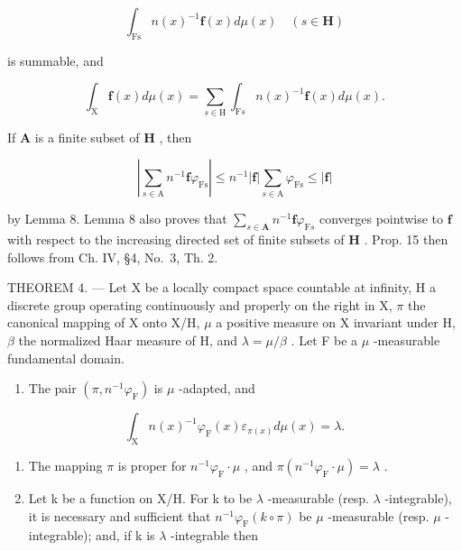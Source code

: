 \[
\int_ {\mathrm{Fs}} n (x) ^ {- 1} \mathbf {f} (x) d \mu (x) \quad (s \in \mathbf {H})
\]

is summable, and

\[
\int_ {\mathrm{X}} \mathbf {f} (x) d \mu (x) = \sum_ {s \in \mathrm{H}} \int_ {\mathrm{F} s} n (x) ^ {- 1} \mathbf {f} (x) d \mu (x).
\]

If \(\mathbf{A}\) is a finite subset of \(\mathbf{H}\) , then

\[
\left| \sum_ {s \in \mathrm{A}} n ^ {- 1} \mathbf {f} \varphi_ {\mathrm{Fs}} \right| \leqslant n ^ {- 1} | \mathbf {f} | \sum_ {s \in \mathrm{A}} \varphi_ {\mathrm{Fs}} \leqslant | \mathbf {f} |
\]

by Lemma 8. Lemma 8 also proves that \(\sum_{s\in\mathbf{A}}n^{-1}\mathbf{f}\varphi_{\mathrm{F}s}\) converges pointwise to \(\mathbf{f}\) with respect to the increasing directed set of finite subsets of \(\mathbf{H}\) . Prop. 15 then follows from Ch. IV, §4, No.~3, Th. 2.

THEOREM 4. --- Let X be a locally compact space countable at infinity, H a discrete group operating continuously and properly on the right in X, \(\pi\) the canonical mapping of X onto X/H, \(\mu\) a positive measure on X invariant under H, \(\beta\) the normalized Haar measure of H, and \(\lambda = \mu/\beta\) . Let F be a \(\mu\) -measurable fundamental domain.

\begin{enumerate}
\def\labelenumi{\alph{enumi})}
\tightlist
\item
  The pair \((\pi, n^{-1}\varphi_{\mathrm{F}})\) is \(\mu\) -adapted, and
\end{enumerate}

\[
\int_ {\mathrm{X}} n (x) ^ {- 1} \varphi_ {\mathrm{F}} (x) \varepsilon_ {\pi (x)} d \mu (x) = \lambda .
\]

\begin{enumerate}
\def\labelenumi{\alph{enumi})}
\setcounter{enumi}{1}
\item
  The mapping \(\pi\) is proper for \(n^{-1}\varphi_{\mathrm{F}}\cdot \mu\) , and \(\pi (n^{-1}\varphi_{\mathrm{F}}\cdot \mu) = \lambda\) .
\item
  Let k be a function on X/H. For k to be \(\lambda\) -measurable (resp. \(\lambda\) -integrable), it is necessary and sufficient that \(n^{-1}\varphi_{\mathrm{F}}(k\circ\pi)\) be \(\mu\) -measurable (resp. \(\mu\) -integrable); and, if k is \(\lambda\) -integrable then
\end{enumerate}

